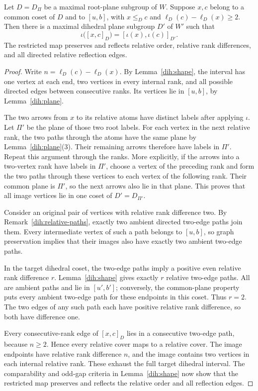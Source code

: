 \begin{proposition}
\label{dih:transport}
Let $D=D_\Pi$ be a maximal root-plane subgroup of $W$.
Suppose $x,c$ belong to a common coset of $D$ and to $[u,b]$, with
$x\le_D c$ and $\ell_D(c)-\ell_D(x)\ge2$.  Then there is a maximal dihedral plane
subgroup $D'$ of $W'$ such that
\[
 \iota\bigl([x,c]_D\bigr)
 =[\iota(x),\iota(c)]_{D'}.
\]
The restricted map preserves and reflects relative order, relative
rank differences, and all directed relative reflection edges.
\end{proposition}

\begin{proof}
Write $n=\ell_D(c)-\ell_D(x)$.  By Lemma~\ref{dih:shape}, the interval
has one vertex at each end, two vertices in every internal rank,
and all possible directed edges between consecutive ranks.  Its
vertices lie in $[u,b]$, by Lemma~\ref{dih:plane}.

The two arrows from $x$ to its relative atoms have distinct labels
after applying $\iota$.  Let $\Pi'$ be the plane of those two root
labels.  For each vertex in the next relative rank, the two paths
through the atoms have the same plane by Lemma~\ref{dih:plane}(3).
Their remaining arrows therefore have labels in $\Pi'$.  Repeat
this argument through the ranks.  More explicitly, if the arrows
into a two-vertex rank have labels in $\Pi'$, choose a vertex of
the preceding rank and form the two paths through these vertices
to each vertex of the following rank.  Their common plane is
$\Pi'$, so the next arrows also lie in that plane.  This proves
that all image vertices lie in one coset of $D'=D_{\Pi'}$.

Consider an original pair of vertices with relative rank
difference two.  By Remark~\ref{dih:relative-paths}, exactly two ambient
directed two-edge paths join them.  Every intermediate vertex of
such a path belongs to $[u,b]$, so graph preservation implies
that their images also have exactly two ambient two-edge paths.

In the target dihedral coset, the two-edge paths imply a positive even
relative rank difference $r$.  Lemma~\ref{dih:shape} gives exactly $r$
relative two-edge paths.  All are ambient paths and lie in $[u',b']$;
conversely, the common-plane property puts every ambient two-edge path
for these endpoints in this coset.  Thus $r=2$.  The two edges of any
such path each have
positive relative rank difference, so both have difference one.

Every consecutive-rank edge of $[x,c]_D$ lies in a consecutive
two-edge path, because $n\ge2$.  Hence every relative cover maps
to a relative cover.  The image endpoints have relative rank
difference $n$, and the image contains two vertices in each
internal relative rank.  These exhaust the full target dihedral
interval.  The comparability and odd-gap criteria in Lemma~\ref{dih:shape}
now show that the restricted map preserves and reflects the relative order
and all reflection edges.
\end{proof}

